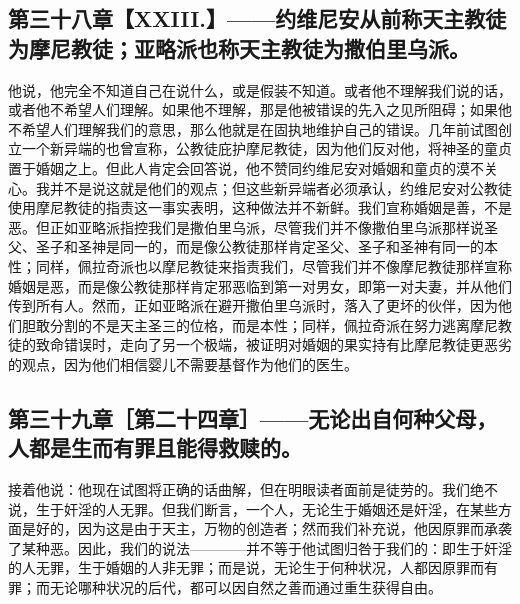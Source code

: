 
\subsection{第三十八章【XXIII.】——约维尼安从前称天主教徒为摩尼教徒；亚略派也称天主教徒为撒伯里乌派。}

他说，他完全不知道自己在说什么，或是假装不知道。或者他不理解我们说的话，或者他不希望人们理解。如果他不理解，那是他被错误的先入之见所阻碍；如果他不希望人们理解我们的意思，那么他就是在固执地维护自己的错误。几年前试图创立一个新异端的也曾宣称，公教徒庇护摩尼教徒，因为他们反对他，将神圣的童贞置于婚姻之上。但此人肯定会回答说，他不赞同约维尼安对婚姻和童贞的漠不关心。我并不是说这就是他们的观点；但这些新异端者必须承认，约维尼安对公教徒使用摩尼教徒的指责这一事实表明，这种做法并不新鲜。我们宣称婚姻是善，不是恶。但正如亚略派指控我们是撒伯里乌派，尽管我们并不像撒伯里乌派那样说圣父、圣子和圣神是同一的，而是像公教徒那样肯定圣父、圣子和圣神有同一的本性；同样，佩拉奇派也以摩尼教徒来指责我们，尽管我们并不像摩尼教徒那样宣称婚姻是恶，而是像公教徒那样肯定邪恶临到第一对男女，即第一对夫妻，并从他们传到所有人。然而，正如亚略派在避开撒伯里乌派时，落入了更坏的伙伴，因为他们胆敢分割的不是天主圣三的位格，而是本性；同样，佩拉奇派在努力逃离摩尼教徒的致命错误时，走向了另一个极端，被证明对婚姻的果实持有比摩尼教徒更恶劣的观点，因为他们相信婴儿不需要基督作为他们的医生。\par


\subsection{第三十九章［第二十四章］——无论出自何种父母，人都是生而有罪且能得救赎的。}

接着他说：他现在试图将正确的话曲解，但在明眼读者面前是徒劳的。我们绝不说，生于奸淫的人无罪。但我们断言，一个人，无论生于婚姻还是奸淫，在某些方面是好的，因为这是由于天主，万物的创造者；然而我们补充说，他因原罪而承袭了某种恶。因此，我们的说法————并不等于他试图归咎于我们的：即生于奸淫的人无罪，生于婚姻的人非无罪；而是说，无论生于何种状况，人都因原罪而有罪；而无论哪种状况的后代，都可以因自然之善而通过重生获得自由。\par

